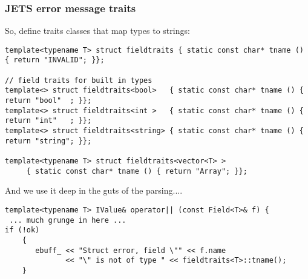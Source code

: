 \begin{frame}[fragile,t]
\frametitle{JETS error message traits}

So, define traits classes that map types to strings:

{\scriptsize\begin{verbatim}
template<typename T> struct fieldtraits { static const char* tname () { return "INVALID"; }};

// field traits for built in types
template<> struct fieldtraits<bool>   { static const char* tname () { return "bool"  ; }};
template<> struct fieldtraits<int >   { static const char* tname () { return "int"   ; }};
template<> struct fieldtraits<string> { static const char* tname () { return "string"; }};

template<typename T> struct fieldtraits<vector<T> > 
     { static const char* tname () { return "Array"; }};
\end{verbatim}
}
\pause
And we use it deep in the guts of the parsing....
{\scriptsize\begin{verbatim}
template<typename T> IValue& operator|| (const Field<T>& f) {
 ... much grunge in here ...
if (!ok)
    {
       ebuff_ << "Struct error, field \"" << f.name
              << "\" is not of type " << fieldtraits<T>::tname();
    }
\end{verbatim}
}
\pause
\begin{center}
\end{center}
\end{frame}



